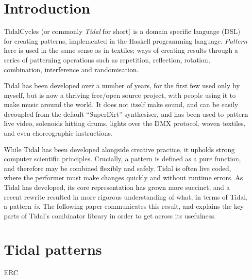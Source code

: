 \documentclass[acmsmall]{acmart}
\begin{document}

%

\maketitle

\section{Introduction}

TidalCycles (or commonly \emph{Tidal} for short) is a domain specific
language (DSL) for creating patterns, implemented in the Haskell
programming language. \emph{Pattern} here is used in the same sense as
in textiles; ways of creating results through a series of patterning
operations such as repetition, reflection, rotation, combination,
interference and randomisation.

Tidal has been developed over a number of years, for the first few
used only by myself, but is now a thriving free/open source project,
with people using it to make music around the world. It does not
itself make sound, and can be easily decoupled from the default
``SuperDirt'' synthesiser, and has been used to pattern live video,
solenoids hitting drums, lights over the DMX protocol, woven textiles,
and even choreographic instructions.

While Tidal has been developed alongside creative practice, it upholds
strong computer scientific principles. Crucially, a pattern is defined
as a pure function, and therefore may be combined flexibly and safely.
Tidal is often live coded, where the performer must make changes
quickly and without runtime errors. As Tidal has developed, its core
representation has grown more succinct, and a recent rewrite resulted
in more rigorous understanding of what, in terms of Tidal, a pattern
\emph{is}. The following paper communicates this result, and explains
the key parts of Tidal's combinator library in order to get across its
usefulness.

\section{Tidal patterns}



\begin{acks}
ERC
\end{acks}



\end{document}
